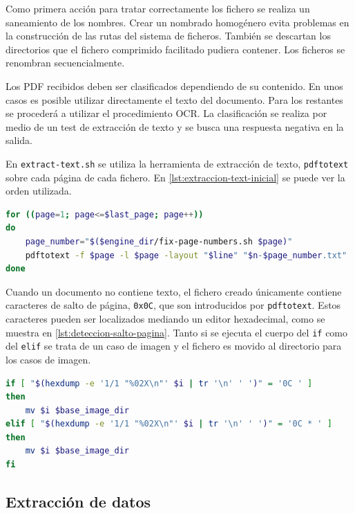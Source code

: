 
Como primera acción para tratar correctamente los fichero se realiza un saneamiento de los nombres. Crear un nombrado homogénero evita problemas en la construcción de las rutas del sistema de ficheros. También se descartan los directorios que el fichero comprimido facilitado pudiera contener. Los ficheros se renombran secuencialmente.

Los PDF recibidos deben ser clasificados dependiendo de su contenido. En unos casos es posible utilizar directamente el texto del documento. Para los restantes se procederá a utilizar el procedimiento OCR. La clasificación se realiza por medio de un test de extracción de texto y se busca una respuesta negativa en la salida.

En \verb|extract-text.sh| se utiliza la herramienta de extracción de texto, \verb|pdftotext| sobre cada página de cada fichero. En \ref{lst:extraccion-text-inicial} se puede ver la orden utilizada.

\begin{lstlisting}[language=bash,caption={Extracción tentativa del texto},label=lst:extraccion-text-inicial]
for ((page=1; page<=$last_page; page++))
do
    page_number="$($engine_dir/fix-page-numbers.sh $page)"
    pdftotext -f $page -l $page -layout "$line" "$n-$page_number.txt"
done
\end{lstlisting}

Cuando un documento no contiene texto, el fichero creado únicamente contiene caracteres de salto de página, \verb|0x0C|, que son introducidos por \verb|pdftotext|. Estos caracteres pueden ser localizados mediando un editor hexadecimal, como se muestra en \ref{lst:deteccion-salto-pagina}. Tanto si se ejecuta el cuerpo del \verb|if| como del \verb|elif| se trata de un caso de imagen y el fichero es movido al directorio para los casos de imagen.

\begin{lstlisting}[language=bash,caption={Detección del salto de página},label=lst:deteccion-salto-pagina]
if [ "$(hexdump -e '1/1 "%02X\n"' $i | tr '\n' ' ')" = '0C ' ]
then
    mv $i $base_image_dir
elif [ "$(hexdump -e '1/1 "%02X\n"' $i | tr '\n' ' ')" = '0C * ' ]
then
    mv $i $base_image_dir
fi
\end{lstlisting}

\subsection{Extracción de datos}

